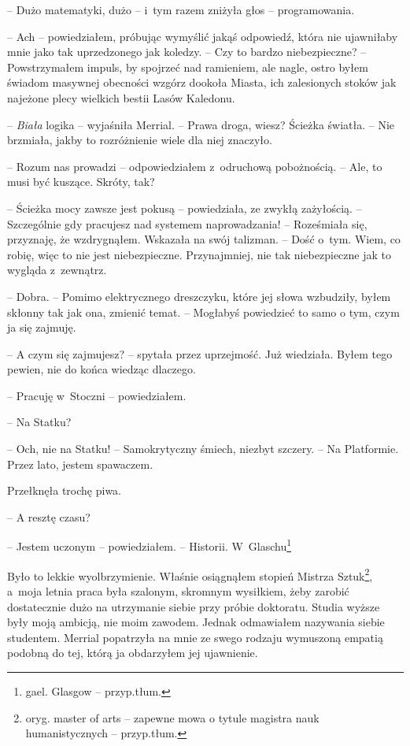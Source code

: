\documentclass[oneside,polish,11pt,sfheadings]{mwbk}
\begin{document}
-- Dużo matematyki, dużo -- i~tym razem zniżyła głos -- programowania.

-- Ach -- powiedziałem, próbując wymyślić jakąś odpowiedź, która nie
ujawniłaby mnie jako tak uprzedzonego jak koledzy. -- Czy to bardzo
niebezpieczne? -- Powstrzymałem impuls, by spojrzeć nad ramieniem, ale
nagle, ostro byłem świadom masywnej obecności wzgórz dookoła Miasta, ich
zalesionych stoków jak najeżone plecy wielkich bestii Lasów Kaledonu.

-- \textit{Biała} logika -- wyjaśniła Merrial. -- Prawa droga, wiesz? Ścieżka
światła. -- Nie brzmiała, jakby to rozróżnienie wiele dla niej znaczyło.

-- Rozum nas prowadzi -- odpowiedziałem z~odruchową pobożnością. -- Ale, to
musi być kuszące. Skróty, tak?

-- Ścieżka mocy zawsze jest pokusą -- powiedziała, ze zwykłą zażyłością. -- Szczególnie gdy pracujesz nad systemem naprowadzania! -- Roześmiała się,
przyznaję, że wzdrygnąłem. Wskazała na swój talizman. -- Dość o~tym.
Wiem, co robię, więc to nie jest niebezpieczne. Przynajmniej, nie tak
niebezpieczne jak to wygląda z~zewnątrz.

-- Dobra. -- Pomimo elektrycznego dreszczyku, które jej słowa wzbudziły,
byłem skłonny tak jak ona, zmienić temat. -- Mogłabyś powiedzieć to samo
o tym, czym ja się zajmuję.

-- A czym się zajmujesz? -- spytała przez uprzejmość. Już wiedziała. Byłem
tego pewien, nie do końca wiedząc dlaczego.

-- Pracuję w~Stoczni -- powiedziałem.

-- Na Statku?

-- Och, nie na Statku! -- Samokrytyczny śmiech, niezbyt szczery. -- Na
Platformie. Przez lato, jestem spawaczem.

Przełknęła trochę piwa. 

-- A resztę czasu?

-- Jestem uczonym -- powiedziałem. -- Historii. W~Glaschu\footnote{ gael. Glasgow
-- przyp.tłum.}

Było to lekkie wyolbrzymienie. Właśnie osiągnąłem stopień Mistrza
Sztuk\footnote{ oryg. master of arts -- zapewne mowa o tytule magistra nauk
humanistycznych -- przyp.tłum.}, a~moja letnia praca była szalonym,
skromnym wysiłkiem, żeby zarobić dostatecznie dużo na utrzymanie siebie
przy próbie doktoratu. Studia wyższe były moją ambicją, nie moim
zawodem. Jednak odmawiałem nazywania siebie studentem. Merrial
popatrzyła na mnie ze swego rodzaju wymuszoną empatią podobną do tej,
którą ja obdarzyłem jej ujawnienie. 
\end{document}
